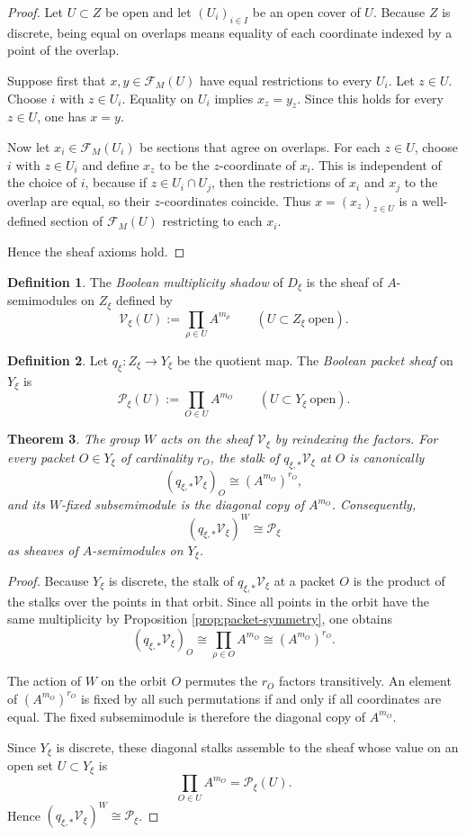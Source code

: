 \documentclass[11pt,a4paper]{article}
\newtheorem{theorem}{Theorem}[section]
\theoremstyle{definition}
\newtheorem{definition}[theorem]{Definition}
\theoremstyle{remark}
\newcommand{\cV}{\mathcal V}
\newcommand{\cP}{\mathcal P}
\newcommand{\cF}{\mathcal F}
\begin{document}
\begin{proof}
Let $U\subset Z$ be open and let $(U_i)_{i\in I}$ be an open cover of $U$.  Because $Z$ is discrete, being equal on overlaps means equality of each coordinate indexed by a point of the overlap.

Suppose first that $x,y\in \cF_M(U)$ have equal restrictions to every $U_i$.  Let $z\in U$.  Choose $i$ with $z\in U_i$.  Equality on $U_i$ implies $x_z=y_z$.  Since this holds for every $z\in U$, one has $x=y$.

Now let $x_i\in \cF_M(U_i)$ be sections that agree on overlaps.  For each $z\in U$, choose $i$ with $z\in U_i$ and define $x_z$ to be the $z$-coordinate of $x_i$.  This is independent of the choice of $i$, because if $z\in U_i\cap U_j$, then the restrictions of $x_i$ and $x_j$ to the overlap are equal, so their $z$-coordinates coincide.  Thus $x=(x_z)_{z\in U}$ is a well-defined section of $\cF_M(U)$ restricting to each $x_i$.

Hence the sheaf axioms hold.
\end{proof}

\begin{definition}
The \emph{Boolean multiplicity shadow} of $D_\xi$ is the sheaf of $A$-semimodules on $Z_\xi$ defined by
\[
\cV_\xi(U):=\prod_{\rho\in U} A^{m_\rho}
\qquad (U\subset Z_\xi\ \text{open}).
\]
\end{definition}

\begin{definition}
Let $q_\xi:Z_\xi\to Y_\xi$ be the quotient map.  The \emph{Boolean packet sheaf} on $Y_\xi$ is
\[
\cP_\xi(U):=\prod_{O\in U} A^{m_O}
\qquad (U\subset Y_\xi\ \text{open}).
\]
\end{definition}

\begin{theorem}\label{thm:packet-descent-xi}
The group $W$ acts on the sheaf $\cV_\xi$ by reindexing the factors.  For every packet $O\in Y_\xi$ of cardinality $r_O$, the stalk of $q_{\xi,*}\cV_\xi$ at $O$ is canonically
\[
(q_{\xi,*}\cV_\xi)_O\cong (A^{m_O})^{r_O},
\]
and its $W$-fixed subsemimodule is the diagonal copy of $A^{m_O}$.  Consequently,
\[
(q_{\xi,*}\cV_\xi)^W\cong \cP_\xi
\]
as sheaves of $A$-semimodules on $Y_\xi$.
\end{theorem}

\begin{proof}
Because $Y_\xi$ is discrete, the stalk of $q_{\xi,*}\cV_\xi$ at a packet $O$ is the product of the stalks over the points in that orbit.  Since all points in the orbit have the same multiplicity by Proposition \ref{prop:packet-symmetry}, one obtains
\[
(q_{\xi,*}\cV_\xi)_O\cong \prod_{\rho\in O} A^{m_O}\cong (A^{m_O})^{r_O}.
\]

The action of $W$ on the orbit $O$ permutes the $r_O$ factors transitively.  An element of $(A^{m_O})^{r_O}$ is fixed by all such permutations if and only if all coordinates are equal.  The fixed subsemimodule is therefore the diagonal copy of $A^{m_O}$.

Since $Y_\xi$ is discrete, these diagonal stalks assemble to the sheaf whose value on an open set $U\subset Y_\xi$ is
\[
\prod_{O\in U} A^{m_O}=\cP_\xi(U).
\]
Hence $(q_{\xi,*}\cV_\xi)^W\cong \cP_\xi$.
\end{proof}
\end{document}
